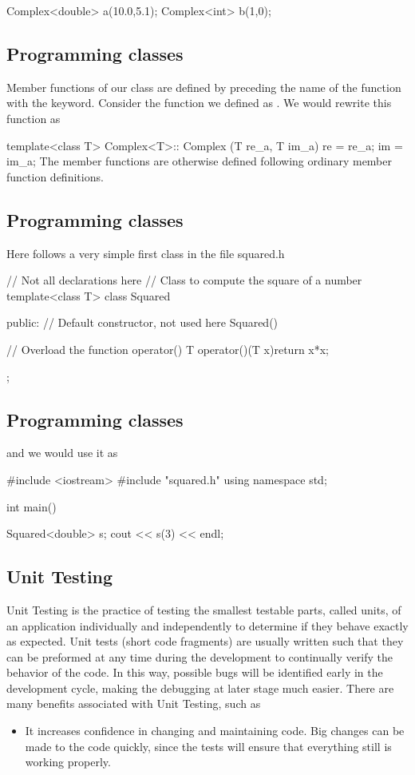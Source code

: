 \documentclass[%
twoside,                 %
final,                   %
10pt]{article}
\newenvironment{block_mdfboxadmon}[1][]{
\begin{block_mdfboxmdframed}[frametitle=#1]
}
{
\end{block_mdfboxmdframed}
}
\begin{document}
{{{{{{{{{\bcppcod
Complex<double> a(10.0,5.1);
Complex<int> b(1,0);
\ecppcod

\subsection{Programming classes}

Member functions of our class are defined by preceding the name of the function with the  keyword.
Consider the function we defined as .
We would rewrite this function as

\bcppcod
template<class T>
Complex<T>:: Complex (T re_a, T im_a)
{ re = re_a; im = im_a; }
\ecppcod
The member functions  are otherwise defined following ordinary member function definitions.

\subsection{Programming classes}

Here follows a very simple first class in the file squared.h

\bcppcod
// Not all declarations here
// Class to compute the square of a number
template<class T>
class Squared{
  public:
    // Default constructor, not used here
    Squared(){}

    // Overload the function operator()
    T operator()(T x){return x*x;}

};
\ecppcod

\subsection{Programming classes}

and we would use it as

\bcppcod
#include <iostream>
#include "squared.h"
using namespace std;

int main(){
  Squared<double> s;
  cout << s(3) << endl;

\ecppcod


\subsection{Unit Testing}

\begin{block_mdfboxadmon}[]
Unit Testing is the practice of testing the smallest testable parts,
called units, of an application individually and independently to
determine if they behave exactly as expected. Unit tests (short code
fragments) are usually written such that they can be preformed at any
time during the development to continually verify the behavior of the
code. In this way, possible bugs will be identified early in the
development cycle, making the debugging at later stage much
easier. There are many benefits associated with Unit Testing, such as
\begin{itemize}
  \item It increases confidence in changing and maintaining code. Big changes can be made to the code quickly, since the tests will ensure that everything still is working properly.


\end{itemize}
\end{block_mdfboxadmon}}}}}}}}}}}
\end{document}
